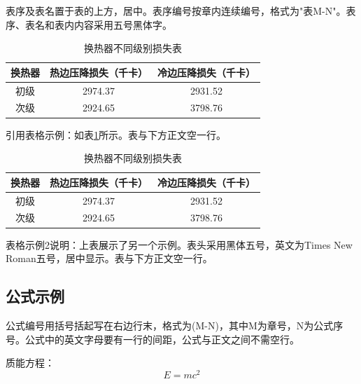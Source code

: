 \documentclass[a4paper,12pt,openany,twoside]{ctexbook}
\begin{document}
表序及表名置于表的上方，居中。表序编号按章内连续编号，格式为"表M-N"。表序、表名和表内内容采用五号黑体字。

\begin{table}[htbp]
    \centering
    \caption{换热器不同级别损失表}
    \label{tab:heat-exchanger}
    \begin{tabular}{c|c|c}
        \hline
        \textbf{换热器} & \textbf{热边压降损失（千卡）} & \textbf{冷边压降损失（千卡）} \\
        \hline
        初级 & 2974.37 & 2931.52 \\
        \hline
        次级 & 2924.65 & 3798.76 \\
        \hline
    \end{tabular}
\end{table}

引用表格示例：如表\ref{tab:heat-exchanger}所示。表与下方正文空一行。

\vspace{\baselineskip}

\begin{table}[htbp]
    \centering
    \caption{换热器不同级别损失表}
    \label{tab:heat-exchanger-2}
    \begin{tabular}{c|c|c}
        \hline
        \textbf{换热器} & \textbf{热边压降损失（千卡）} & \textbf{冷边压降损失（千卡）} \\
        \hline
        初级 & 2974.37 & 2931.52 \\
        \hline
        次级 & 2924.65 & 3798.76 \\
        \hline
    \end{tabular}
\end{table}

表格示例2说明：上表展示了另一个示例。表头采用黑体五号，英文为Times New Roman五号，居中显示。表与下方正文空一行。

\vspace{\baselineskip}

\subsection{公式示例}

公式编号用括号括起写在右边行末，格式为(M-N)，其中M为章号，N为公式序号。公式中的英文字母要有一行的间距，公式与正文之间不需空行。

质能方程：
\begin{equation}
    E = mc^2
    \label{eq:mass-energy}
\end{equation}
\end{document}
